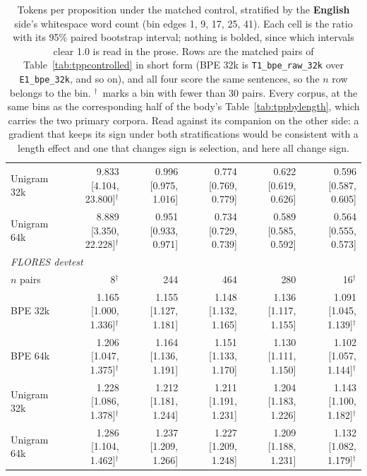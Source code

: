 \begin{table}[t]
\begin{tabular}{lrrrrr}
Unigram 32k & 9.833 [4.104, 23.800]$^{\dagger}$ & 0.996 [0.975, 1.016] & 0.774 [0.769, 0.779] & 0.622 [0.619, 0.626] & 0.596 [0.587, 0.605] \\
Unigram 64k & 8.889 [3.350, 22.228]$^{\dagger}$ & 0.951 [0.933, 0.971] & 0.734 [0.729, 0.739] & 0.589 [0.585, 0.592] & 0.564 [0.555, 0.573] \\
\midrule
\multicolumn{6}{l}{\emph{FLORES devtest}} \\
$n$ pairs & 8$^{\dagger}$ & 244 & 464 & 280 & 16$^{\dagger}$ \\
BPE 32k & 1.165 [1.000, 1.336]$^{\dagger}$ & 1.155 [1.127, 1.181] & 1.148 [1.132, 1.165] & 1.136 [1.117, 1.155] & 1.091 [1.045, 1.139]$^{\dagger}$ \\
BPE 64k & 1.206 [1.047, 1.375]$^{\dagger}$ & 1.164 [1.136, 1.191] & 1.151 [1.133, 1.170] & 1.130 [1.111, 1.150] & 1.102 [1.057, 1.144]$^{\dagger}$ \\
Unigram 32k & 1.228 [1.086, 1.378]$^{\dagger}$ & 1.212 [1.181, 1.244] & 1.211 [1.191, 1.231] & 1.204 [1.183, 1.226] & 1.143 [1.100, 1.182]$^{\dagger}$ \\
Unigram 64k & 1.286 [1.104, 1.462]$^{\dagger}$ & 1.237 [1.209, 1.266] & 1.227 [1.209, 1.248] & 1.209 [1.188, 1.231] & 1.132 [1.082, 1.179]$^{\dagger}$ \\
\bottomrule
\end{tabular}
\caption{Tokens per proposition under the matched control, stratified by the \textbf{English} side's whitespace word count (bin edges 1, 9, 17, 25, 41). Each cell is the ratio with its 95\% paired bootstrap interval; nothing is bolded, since which intervals clear 1.0 is read in the prose. Rows are the matched pairs of Table~\ref{tab:tppcontrolled} in short form (BPE 32k is \texttt{T1\_bpe\_raw\_32k} over \texttt{E1\_bpe\_32k}, and so on), and all four score the same sentences, so the $n$ row belongs to the bin. $^{\dagger}$~marks a bin with fewer than 30 pairs. Every corpus, at the same bins as the corresponding half of the body's Table~\ref{tab:tppbylength}, which carries the two primary corpora. Read against its companion on the other side: a gradient that keeps its sign under both stratifications would be consistent with a length effect and one that changes sign is selection, and here all \numLengthGradientsTotal{} change sign.}
\label{tab:tppbylengthall}
\end{table}

